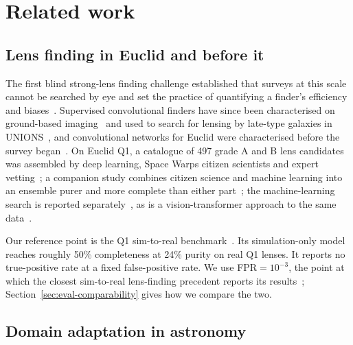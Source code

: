 \section{Related work}
\label{sec:related}

\subsection{Lens finding in Euclid and before it}

The first blind strong-lens finding challenge established that surveys at this scale cannot
be searched by eye and set the practice of quantifying a finder's efficiency and
biases~\citep{metcalf2019challenge}. Supervised convolutional finders have since been
characterised on ground-based imaging~\citep{holismokesXI} and used to search for lensing by
late-type galaxies in UNIONS~\citep{unions2025}, and convolutional networks for Euclid were
characterised before the survey began~\citep{leuzzi2024euclidprep}. On Euclid Q1, a catalogue
of 497 grade A and B lens candidates was assembled by deep learning, Space Warps citizen
scientists and expert vetting~\citep{discoveryengineA}; a companion study combines citizen
science and machine learning into an ensemble purer and more complete than either
part~\citep{discoveryengineE}; the machine-learning search is reported
separately~\citep{lines2025discoveryengineC}, as is a vision-transformer approach to the same
data~\citep{astrovink}.

Our reference point is the Q1 sim-to-real benchmark~\citep{lines2025simstosky}. Its
simulation-only model reaches roughly 50\% completeness at 24\% purity on real Q1 lenses. It
reports no true-positive rate at a fixed false-positive rate. We use FPR${}=10^{-3}$, the
point at which the closest sim-to-real lens-finding precedent reports its
results~\citep{parul2024}; Section~\ref{sec:eval-comparability} gives how we compare the two.

\subsection{Domain adaptation in astronomy}

